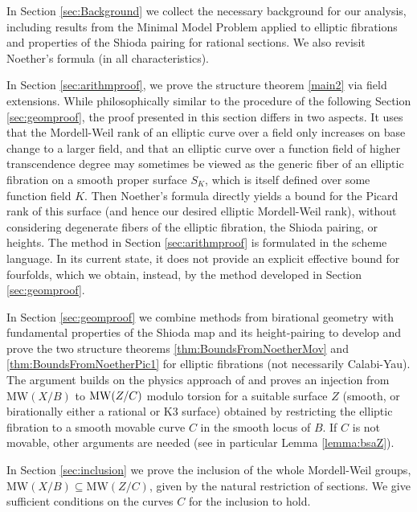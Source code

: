 \documentclass[11pt]{amsart}
\theoremstyle{definition}
\theoremstyle{definition}
\theoremstyle{remark}
\theoremstyle{remark}
\theoremstyle{definition}
\theoremstyle{conjecture}
\newcommand{\MW}{\mathrm{MW}}
\begin{document}
 In Section \ref{sec:Background} we collect the necessary background for our analysis, including results from the Minimal Model Problem applied to elliptic fibrations and properties of the Shioda pairing for rational sections. We also revisit Noether's formula (in all characteristics).

 

In Section \ref{sec:arithmproof}, we prove the structure theorem \ref{main2} via field extensions. 
While philosophically similar to the procedure of the following Section \ref{sec:geomproof}, the proof presented in this section differs in two aspects. It uses that the Mordell-Weil rank of an elliptic curve over a field only increases
on base change to a larger field, and that an elliptic curve over a function field of higher transcendence degree may sometimes be viewed as the generic fiber of an elliptic fibration on a smooth proper surface $S_K$, which is itself defined over some function field $K$. Then Noether's formula directly yields a bound for the Picard rank of this surface (and hence our desired elliptic Mordell-Weil rank), without considering degenerate fibers of the elliptic fibration, the Shioda pairing, or heights.  
The method in Section \ref{sec:arithmproof} is formulated in the scheme language. 
  In its current state, it does not provide an explicit effective bound for fourfolds, which we obtain, instead, by the method developed in Section \ref{sec:geomproof}. 

 In Section \ref{sec:geomproof} we combine methods from birational geometry with fundamental properties of the Shioda map and its height-pairing to  develop and prove the two structure theorems \ref{thm:BoundsFromNoetherMov} and \ref{thm:BoundsFromNoetherPic1} for elliptic fibrations (not necessarily Calabi-Yau).  
 The argument builds on  
 the physics approach of \cite{Lee:2018ihr, Lee:2019skh, Martucci:2022krl, Lee:2022swr} and proves an injection from $\MW(X/B)$ to ${\rm MW}(Z/C)$ modulo torsion  for a suitable surface $Z$ (smooth, or  birationally  either a rational or  K3 surface) obtained by restricting the elliptic fibration to a smooth  movable curve $C$ in the smooth locus of  $B$. 
 If $C$ is not movable, other arguments are needed (see in particular Lemma \ref{lemma:bsaZ}).
 

In Section \ref{sec:inclusion} we prove  the inclusion of the whole Mordell-Weil groups, $\MW(X/B) \subseteq \MW (Z/C)$, given by the natural restriction of sections.
 We  give sufficient conditions on  the curves $C$ for the inclusion to hold.
 
\end{document}
